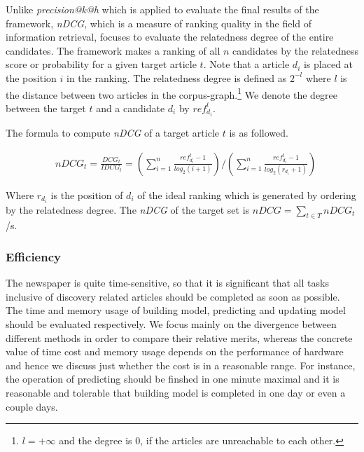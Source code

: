 Unlike \textit{precision@k@h} which is applied to evaluate the final results of the framework, \textit{nDCG}, which is a measure of ranking quality in the field of information retrieval, focuses to evaluate the relatedness degree of the entire candidates. The framework makes a ranking of all $n$ candidates by the relatedness score or probability for a given target article $t$. Note that a article $d_i$ is placed at the position $i$ in the ranking. The relatedness degree is defined as $2^{-l}$ where $l$ is the distance between two articles in the corpus-graph.\footnote{$l=+\infty$ and the degree is $0$, if the articles are unreachable to each other.} We denote the degree between the target $t$ and a candidate $d_i$ by $ref_{d_i}^t$.

The formula to compute \textit{nDCG} of a target article $t$ is as followed. 

\begin{align}
   & nDCG_t = \frac{DCG_t}{IDCG_t} = (\sum_{i=1}^n\frac{ref_{d_i}^t-1}{log_2(i+1)})/(\sum_{i=1}^n\frac{ref_{d_i}^t-1}{log_2(r_{d_i}+1)})
\end{align}

Where $r_{d_i}$ is the position of $d_i$ of the ideal ranking which is generated by ordering by the relatedness degree. The \textit{nDCG} of the target set is $nDCG = \sum_{t \in T}nDCG_t$/s.

\subsubsection{Efficiency}

The newspaper is quite time-sensitive, so that it is significant that all tasks inclusive of discovery related articles should be completed as soon as possible. The time and memory usage of building model, predicting and updating model should be evaluated respectively. We focus mainly on the divergence between different methods in order to compare their relative merits, whereas the concrete value of time cost and memory usage depends on the performance of hardware and hence we discuss just whether the cost is in a reasonable range. For instance, the operation of predicting should be finshed in one minute maximal and it is reasonable and tolerable that building model is completed in one day or even a couple days. 